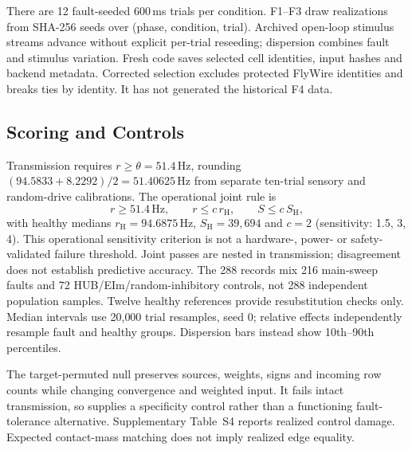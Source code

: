 There are 12 fault-seeded 600\,ms trials per condition. F1--F3 draw realizations from SHA-256 seeds over (phase, condition, trial). Archived open-loop stimulus streams advance without explicit per-trial reseeding; dispersion combines fault and stimulus variation. Fresh code saves selected cell identities, input hashes and backend metadata. Corrected selection excludes protected FlyWire identities and breaks ties by identity. It has not generated the historical F4 data.

\subsection{Scoring and Controls}
Transmission requires $r\geq\theta=51.4$\,Hz, rounding $(94.5833+8.2292)/2=51.40625$\,Hz from separate ten-trial sensory and random-drive calibrations. The operational joint rule is
\begin{equation}
r\geq51.4\,\mathrm{Hz},\qquad r\leq c\,r_{\mathrm H},\qquad S\leq c\,S_{\mathrm H},
\end{equation}
with healthy medians $r_{\mathrm H}=94.6875$\,Hz, $S_{\mathrm H}=39{,}694$ and $c=2$ (sensitivity: 1.5, 3, 4). This operational sensitivity criterion is not a hardware-, power- or safety-validated failure threshold. Joint passes are nested in transmission; disagreement does not establish predictive accuracy. The 288 records mix 216 main-sweep faults and 72 HUB/EIm/random-inhibitory controls, not 288 independent population samples. Twelve healthy references provide resubstitution checks only. Median intervals use 20{,}000 trial resamples, seed 0; relative effects independently resample fault and healthy groups. Dispersion bars instead show 10th--90th percentiles.

The target-permuted null preserves sources, weights, signs and incoming row counts while changing convergence and weighted input. It fails intact transmission, so supplies a specificity control rather than a functioning fault-tolerance alternative. Supplementary Table~S4 reports realized control damage. Expected contact-mass matching does not imply realized edge equality.

